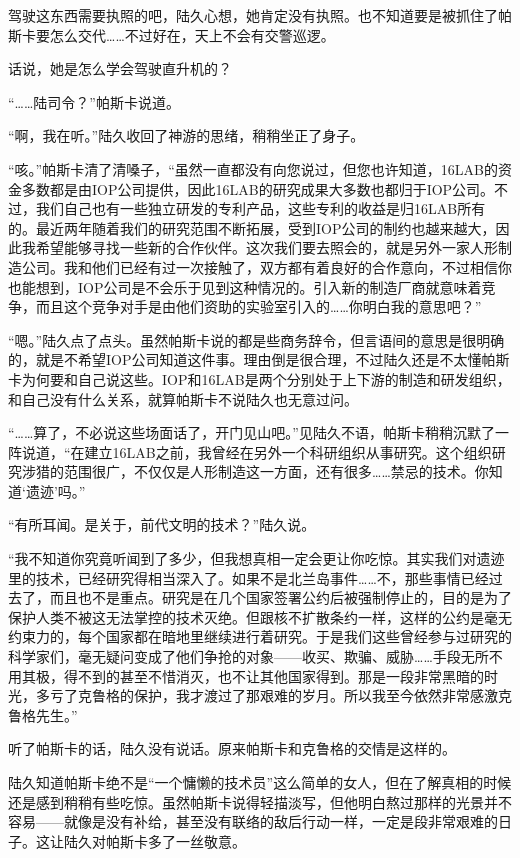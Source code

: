 驾驶这东西需要执照的吧，陆久心想，她肯定没有执照。也不知道要是被抓住了帕斯卡要怎么交代……不过好在，天上不会有交警巡逻。

话说，她是怎么学会驾驶直升机的？

“……陆司令？”帕斯卡说道。

“啊，我在听。”陆久收回了神游的思绪，稍稍坐正了身子。

“咳。”帕斯卡清了清嗓子，“虽然一直都没有向您说过，但您也许知道，16LAB的资金多数都是由IOP公司提供，因此16LAB的研究成果大多数也都归于IOP公司。不过，我们自己也有一些独立研发的专利产品，这些专利的收益是归16LAB所有的。最近两年随着我们的研究范围不断拓展，受到IOP公司的制约也越来越大，因此我希望能够寻找一些新的合作伙伴。这次我们要去照会的，就是另外一家人形制造公司。我和他们已经有过一次接触了，双方都有着良好的合作意向，不过相信你也能想到，IOP公司是不会乐于见到这种情况的。引入新的制造厂商就意味着竞争，而且这个竞争对手是由他们资助的实验室引入的……你明白我的意思吧？”

“嗯。”陆久点了点头。虽然帕斯卡说的都是些商务辞令，但言语间的意思是很明确的，就是不希望IOP公司知道这件事。理由倒是很合理，不过陆久还是不太懂帕斯卡为何要和自己说这些。IOP和16LAB是两个分别处于上下游的制造和研发组织，和自己没有什么关系，就算帕斯卡不说陆久也无意过问。

“……算了，不必说这些场面话了，开门见山吧。”见陆久不语，帕斯卡稍稍沉默了一阵说道，“在建立16LAB之前，我曾经在另外一个科研组织从事研究。这个组织研究涉猎的范围很广，不仅仅是人形制造这一方面，还有很多……禁忌的技术。你知道‘遗迹’吗。”

“有所耳闻。是关于，前代文明的技术？”陆久说。

“我不知道你究竟听闻到了多少，但我想真相一定会更让你吃惊。其实我们对遗迹里的技术，已经研究得相当深入了。如果不是北兰岛事件……不，那些事情已经过去了，而且也不是重点。研究是在几个国家签署公约后被强制停止的，目的是为了保护人类不被这无法掌控的技术灭绝。但跟核不扩散条约一样，这样的公约是毫无约束力的，每个国家都在暗地里继续进行着研究。于是我们这些曾经参与过研究的科学家们，毫无疑问变成了他们争抢的对象——收买、欺骗、威胁……手段无所不用其极，得不到的甚至不惜消灭，也不让其他国家得到。那是一段非常黑暗的时光，多亏了克鲁格的保护，我才渡过了那艰难的岁月。所以我至今依然非常感激克鲁格先生。”

听了帕斯卡的话，陆久没有说话。原来帕斯卡和克鲁格的交情是这样的。

陆久知道帕斯卡绝不是“一个慵懒的技术员”这么简单的女人，但在了解真相的时候还是感到稍稍有些吃惊。虽然帕斯卡说得轻描淡写，但他明白熬过那样的光景并不容易——就像是没有补给，甚至没有联络的敌后行动一样，一定是段非常艰难的日子。这让陆久对帕斯卡多了一丝敬意。

